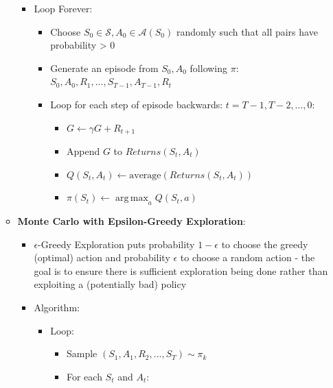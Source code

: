 \documentclass{article}
\providecommand{\tightlist}{%
  \setlength{\itemsep}{\GlobalItemSep}\setlength{\parskip}{\GlobalListParSkip}}
\newlength{\GlobalItemSep}
\newlength{\GlobalListParSkip}
\DeclareMathOperator*{\argmax}{arg\,max}
\begin{document}
\begin{multicols}{2}
\begin{itemize}
\begin{itemize}
    \begin{itemize}
    \tightlist
    \item
      Loop Forever:

      \begin{itemize}
      \tightlist
      \item
        Choose \(S_0 \in \mathcal{S}, A_0 \in \mathcal{A}(S_0)\)
        randomly such that all pairs have probability \textgreater{} 0
      \item
        Generate an episode from \(S_0, A_0\) following \(\pi\):
        \(S_0, A_0, R_1, ..., S_{T-1}, A_{T-1}, R_t\)
      \item
        Loop for each step of episode backwards:
        \(t = T - 1, T - 2, ..., 0\):

        \begin{itemize}
        \tightlist
        \item
          \(G \leftarrow \gamma G + R_{t+1}\)
        \item
          Append \(G\) to \(Returns(S_t, A_t)\)
        \item
          \(Q(S_t, A_t) \leftarrow \text{average}(Returns(S_t, A_t))\)
        \item
          \(\pi(S_t) \leftarrow \argmax_{a} Q(S_t, a)\)
        \end{itemize}
      \end{itemize}
    \end{itemize}
  \item
    \textbf{Monte Carlo with Epsilon-Greedy Exploration}:

    \begin{itemize}
    \tightlist
    \item
      \(\epsilon\)-Greedy Exploration puts probability \(1 - \epsilon\)
      to choose the greedy (optimal) action and probability \(\epsilon\)
      to choose a random action - the goal is to ensure there is
      sufficient exploration being done rather than exploiting a
      (potentially bad) policy
    \item
      Algorithm:

      \begin{itemize}
      \tightlist
      \item
        Loop:

        \begin{itemize}
        \tightlist
        \item
          Sample \((S_1, A_1, R_2, ..., S_T) \sim \pi_k\)
        \item
          For each \(S_t\) and \(A_t\):


\end{itemize}
\end{itemize}
\end{itemize}
\end{itemize}
\end{itemize}
\end{multicols}
\end{document}
